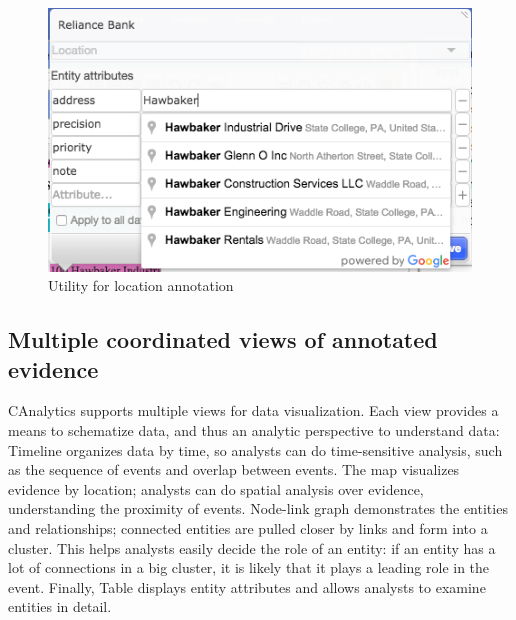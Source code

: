\begin{figure}
	\centering
	\includegraphics[width=\columnwidth]{03-System/img/annotation-location.png}
	\caption{Utility for location annotation \label{fig:annotation-location}}
\end{figure}

\subsection{Multiple coordinated views of annotated evidence}

CAnalytics supports multiple views for data visualization. Each view provides a means to schematize data, and thus an analytic perspective to understand data:
Timeline organizes data by time, so analysts can do time-sensitive analysis, such as the sequence of events and overlap between events. The map visualizes evidence by location; analysts can do spatial analysis over evidence, understanding the proximity of events.  Node-link graph demonstrates the entities and relationships; connected entities are pulled closer by links and form into a cluster. This helps analysts easily decide the role of an entity: if an entity has a lot of connections in a big cluster, it is likely that it plays a leading role in the event. Finally, Table displays entity attributes and allows analysts to examine entities in detail.  

